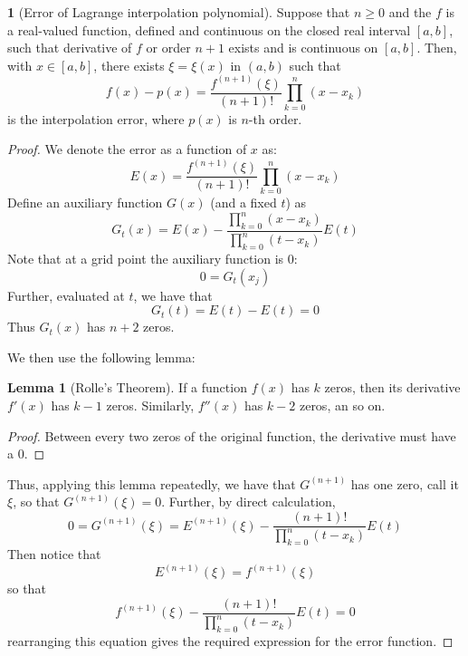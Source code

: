 \documentclass[12pt]{article}
\theoremstyle{definition}
\newtheorem{theorem}{\color{ForestGreen}{\textbf{Theorem}}}
\newtheorem{lemma}{Lemma}
\theoremstyle{definition}
\begin{document}
\begin{theorem}[Error of Lagrange interpolation polynomial]
	Suppose that $n\geq 0$ and the $f$ is a real-valued function, defined and continuous on the closed real interval $[a,b]$, such that derivative of $f$ or order $n+1$ exists and is continuous on $[a,b]$. Then, with $x \in [a,b]$, there exists $\xi = \xi(x)$ in $(a,b)$ such that
	\begin{equation}
		f(x) - p(x) = \frac{f^{(n+1)}(\xi)}{(n+1)!} \prod_{k=0}^n (x-x_k)
	\end{equation}
	is the interpolation error, where $p(x)$ is $n$-th order. 
\end{theorem}
\begin{proof}
We denote the error as a function of $x$ as:
\begin{equation}
	E(x) = \frac{f^{(n+1)}(\xi)}{(n+1)!} \prod_{k=0}^n (x-x_k)
\end{equation}
Define an auxiliary function $G(x)$ (and a fixed $t$) as 
\begin{equation}
	G_t(x) = E(x) - \frac{\prod_{k=0}^n (x-x_k)}{\prod_{k=0}^n (t-x_k)}E(t)
\end{equation}
Note that at a grid point the auxiliary function is $0$:
\begin{equation}
	0 = G_t(x_j) 
\end{equation}
Further, evaluated at $t$, we have that
\begin{equation}
	G_t(t) = E(t) - E(t) = 0
\end{equation}
Thus $G_t(x)$ has $n+2$ zeros.

We then use the following lemma:
\begin{lemma}[Rolle's Theorem]
	If a function $f(x)$ has $k$ zeros, then its derivative $f'(x)$ has $k-1$ zeros. Similarly, $f''(x)$ has $k-2$ zeros, an so on.
\end{lemma}
\begin{proof}
	Between every two zeros of the original function, the derivative must have a $0$.
\end{proof}

Thus, applying this lemma repeatedly, we have that $G^{(n+1)}$ has one zero, call it $\xi$, so that $G^{(n+1)}(\xi) = 0$. Further, by direct calculation,
\begin{equation}
	0 = G^{(n+1)}(\xi) = E^{(n+1)}(\xi) - \frac{(n+1)!}{\prod_{k=0}^n (t-x_k)}E(t)
\end{equation}
Then notice that 
\begin{equation}
	E^{(n+1)}(\xi) = f^{(n+1)}(\xi)
\end{equation}
so that
\begin{equation}
	f^{(n+1)}(\xi) - \frac{(n+1)!}{\prod_{k=0}^n (t-x_k)}E(t) = 0
\end{equation}
rearranging this equation gives the required expression for the error function.
\end{proof}
\end{document}
